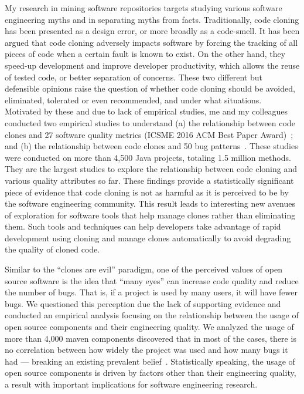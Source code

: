 \documentclass[a4paper]{article}
\begin{document}
My research in mining software repositories targets studying various
software engineering myths and in separating myths from facts. 
Traditionally, code cloning has been presented as a design error, or more broadly as a code-smell. It has been argued that
code cloning adversely impacts software by forcing the tracking of all pieces of code when a
certain fault is known to exist. On the other hand, they speed-up development and improve developer productivity,
which allows the reuse of tested code, or better separation of concerns. These two different but
defensible opinions raise the question of whether code cloning should be avoided, eliminated,
tolerated or even recommended, and under what situations. 
Motivated by these and due to lack of empirical studies, me and my colleagues conducted two empirical
studies to understand (a) the relationship between code clones and 27 software quality metrics
(ICSME 2016 ACM Best Paper Award)~\cite{quality-clones}; and (b) the relationship between code clones and 50 bug
patterns~\cite{bugpatterns}. These studies were conducted on more than 4,500 Java projects, totaling
1.5 million methods. They are the largest studies to explore the
relationship between code cloning and various quality attributes so far. 
These findings provide a statistically significant piece of evidence that code cloning is not as
harmful as it is perceived to be by the software engineering community. This result leads to
interesting new avenues of exploration for software tools that help manage clones rather than
eliminating them. Such tools and techniques can help developers take advantage of rapid
development using cloning and manage clones automatically to avoid degrading the quality of
cloned code. 

Similar to the \enquote{clones are evil} paradigm, one of the perceived values of open source software is the idea that \enquote{many eyes} can increase code quality and reduce the number
of bugs. That is, if a project is used by many users, it will have fewer bugs. We
questioned this perception due the lack of supporting evidence and conducted an
empirical analysis focusing on the relationship between the usage of open source
components and their engineering quality. We analyzed the usage of more than 4,000 maven components discovered that
in most of the cases, there is no correlation between how widely the project was used
and how many bugs it had --- breaking an existing prevalent belief~\cite{quality-popularity}. Statistically speaking,
the usage of open source components is driven by factors other than their engineering
quality, a result with important implications for software engineering research. 
\end{document}
